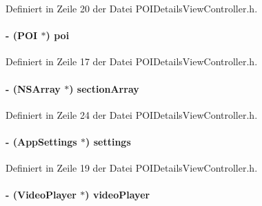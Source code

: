 Definiert in Zeile 20 der Datei POIDetailsViewController.h.\hypertarget{interface_p_o_i_details_view_controller_a9891551c8855e8c76c160fbc32d6c99e}{
\paragraph[{poi}]{\setlength{\rightskip}{0pt plus 5cm}-\/ ({\bf POI} $\ast$) poi}\hfill}
\label{interface_p_o_i_details_view_controller_a9891551c8855e8c76c160fbc32d6c99e}


Definiert in Zeile 17 der Datei POIDetailsViewController.h.\hypertarget{interface_p_o_i_details_view_controller_ad31edb83a1fd1d6f6af800f293a25334}{
\paragraph[{sectionArray}]{\setlength{\rightskip}{0pt plus 5cm}-\/ (NSArray $\ast$) sectionArray}\hfill}
\label{interface_p_o_i_details_view_controller_ad31edb83a1fd1d6f6af800f293a25334}


Definiert in Zeile 24 der Datei POIDetailsViewController.h.\hypertarget{interface_p_o_i_details_view_controller_aa7b02f858154ff80725c355aad693658}{
\paragraph[{settings}]{\setlength{\rightskip}{0pt plus 5cm}-\/ ({\bf AppSettings} $\ast$) settings}\hfill}
\label{interface_p_o_i_details_view_controller_aa7b02f858154ff80725c355aad693658}


Definiert in Zeile 19 der Datei POIDetailsViewController.h.\hypertarget{interface_p_o_i_details_view_controller_ac1d9379646041b896d3d66f4ccacdd16}{
\paragraph[{videoPlayer}]{\setlength{\rightskip}{0pt plus 5cm}-\/ ({\bf VideoPlayer} $\ast$) videoPlayer}\hfill}
\label{interface_p_o_i_details_view_controller_ac1d9379646041b896d3d66f4ccacdd16}


